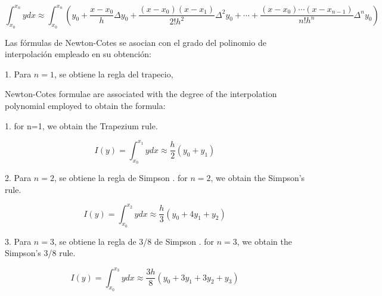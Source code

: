 \begin{equation*}
\int_{x_0}^{x_n}ydx \approx \int_{x_0}^{x_n}\left(y_0+\frac{x-x_0}{h}\Delta y_0+\frac{(x-x_0)(x-x_1)}{2!h^2}\Delta ^2 y_0+\cdots +\frac{(x-x_0)\cdots(x-x_{n-1})}{n!h^n}\Delta^n y_0 \right)
\end{equation*}
\begin{paracol}{2}
Las fórmulas de Newton-Cotes se asocian con el grado del polinomio de interpolación empleado en su obtención:

1. Para $n=1$, se obtiene la regla del trapecio,

\switchcolumn
Newton-Cotes formulae are associated with the degree of the interpolation polynomial employed to obtain the formula:

1. for n=1, we obtain the Trapezium rule.
\end{paracol}
\begin{equation*}
I(y)=\int_{x_0}^{x_1}ydx \approx \frac{h}{2}(y_0+y_1)
\end{equation*}
\begin{paracol}{2}
2. Para $n=2$, se obtiene la regla de Simpson
. for $n=2$, we obtain the Simpson's rule.
\end{paracol} 
\begin{equation*}
I(y)=\int_{x_0}^{x_2}ydx \approx \frac{h}{3}(y_0+4y_1+y_2)
\end{equation*}
\begin{paracol}{2}
3. Para $n=3$, se obtiene la regla de 3/8 de Simpson
. for $n = 3$, we obtain the Simpson's 3/8 rule.
\end{paracol}
\begin{equation*}
I(y)=\int_{x_0}^{x_3}ydx \approx \frac{3h}{8}(y_0+3y_1+3y_2+y_3)
\end{equation*}

